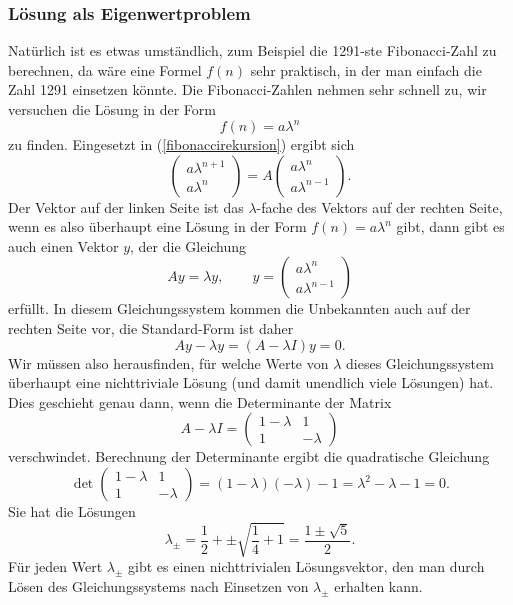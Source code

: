 \subsubsection{Lösung als Eigenwertproblem}
Natürlich ist es etwas umständlich, zum Beispiel die 1291-ste Fibonacci-Zahl
zu berechnen, da wäre eine Formel $f(n)$ sehr praktisch, in der man einfach
die Zahl 1291 einsetzen könnte.
Die Fibonacci-Zahlen nehmen sehr schnell zu, 
wir versuchen die Lösung in der Form
\[
f(n)=a\lambda^n
\]
zu finden. Eingesetzt in (\ref{fibonaccirekursion}) ergibt sich
\[
\begin{pmatrix}a\lambda^{n+1}\\a\lambda^n\end{pmatrix}
=A\begin{pmatrix}a\lambda^n\\a\lambda^{n-1}\end{pmatrix}.
\]
Der Vektor auf der linken Seite ist das $\lambda$-fache des Vektors
auf der rechten Seite, wenn es also überhaupt eine Lösung in der
Form $f(n)=a\lambda^n$ gibt, dann gibt es auch einen Vektor $y$, der
die Gleichung
\begin{equation}
Ay=\lambda y, \qquad y=\begin{pmatrix}
a\lambda^n\\a\lambda^{n-1}
\end{pmatrix}
\end{equation}
erfüllt. In diesem Gleichungssystem kommen die Unbekannten auch auf
der rechten Seite vor, die Standard-Form ist daher
\[
Ay-\lambda y=(A-\lambda I)y=0.
\]
Wir müssen also herausfinden, für welche Werte von $\lambda$ dieses
Gleichungssystem überhaupt eine nichttriviale Lösung (und damit unendlich
viele Lösungen) hat.
Dies geschieht genau dann, wenn die Determinante der Matrix
\[
A-\lambda I=\begin{pmatrix}1-\lambda&1\\1&-\lambda\end{pmatrix}
\]
verschwindet.
Berechnung der Determinante ergibt die quadratische Gleichung
\[
\det
\begin{pmatrix}1-\lambda&1\\1&-\lambda\end{pmatrix}
=(1-\lambda)(-\lambda)-1=\lambda^2-\lambda-1=0.
\]
Sie hat die Lösungen
\[
\lambda_{\pm}=\frac12+\pm\sqrt{\frac14+1}=\frac{1\pm\sqrt{5}}2.
\]
Für jeden Wert $\lambda_{\pm}$ gibt es einen nichttrivialen
Lösungsvektor, den man durch Lösen des Gleichungssystems nach
Einsetzen von $\lambda_{\pm}$ erhalten kann.

